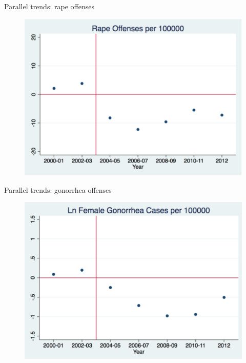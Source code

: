 \documentclass{beamer}
\begin{document}
\begin{frame}[shrink=20]{Parallel trends: rape offenses}
	\begin{figure}
	\includegraphics[scale=0.35]{./lecture_includes/figure2a.pdf}
	\end{figure}
\end{frame}

\begin{frame}[shrink=20]{Parallel trends: gonorrhea offenses}
	\begin{figure}
	\includegraphics[scale=0.35]{./lecture_includes/figure2b.pdf}
	\end{figure}
\end{frame}


\clearpage
\end{document}
